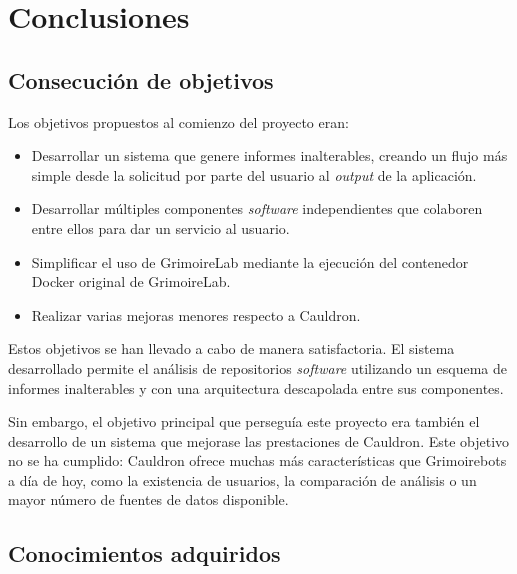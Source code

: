 
\chapter{Conclusiones} %

\label{Chapter5} %


\section{Consecución de objetivos}

Los objetivos propuestos al comienzo del proyecto eran:

\begin{itemize}
    \item Desarrollar un sistema que genere informes inalterables, creando un flujo más simple desde la solicitud por parte del usuario al \emph{output} de la aplicación.
    \item Desarrollar múltiples componentes \emph{software} independientes que colaboren entre ellos para dar un servicio al usuario.
    \item Simplificar el uso de GrimoireLab mediante la ejecución del contenedor Docker original de GrimoireLab.
    \item Realizar varias mejoras menores respecto a Cauldron.
\end{itemize}

Estos objetivos se han llevado a cabo de manera satisfactoria. El sistema desarrollado permite el análisis de repositorios \emph{software} utilizando un esquema de informes inalterables y con una arquitectura descapolada entre sus componentes.

Sin embargo, el objetivo principal que perseguía este proyecto era también el desarrollo de un sistema que mejorase las prestaciones de Cauldron. Este objetivo no se ha cumplido: Cauldron ofrece muchas más características que Grimoirebots a día de hoy, como la existencia de usuarios, la comparación de análisis o un mayor número de fuentes de datos disponible.


\section{Conocimientos adquiridos}

